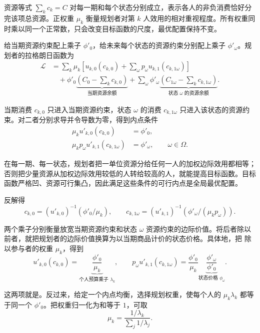 资源等式 $\sum_k c_k=C$ 对每一期和每个状态分别成立，表示各人的非负消费恰好分完该项总资源。正权重 $\mu_k$ 衡量规划者对第 $k$ 人效用的相对重视程度。所有权重同时乘以同一个正常数，只会改变目标函数的尺度，最优配置保持不变。

给当期资源约束配上乘子 $\phi'_0$，给未来每个状态的资源约束分别配上乘子 $\phi'_\omega$。规划者的拉格朗日函数为
\[
 \begin{aligned}
 \mathcal L
 &=\sum_k\mu_k\left[u_{k,0}(c_{k,0})+
                 \sum_\omega p_\omega u_{k,1}(c_{k,1\omega})\right]\\
 &\quad+\phi'_0\underbrace{\left(C_0-\sum_k c_{k,0}\right)}_{\text{当期资源余额}}
   +\sum_\omega\phi'_\omega
       \underbrace{\left(C_{1\omega}-\sum_k c_{k,1\omega}\right)}_{\text{状态 $\omega$ 的资源余额}}.
 \end{aligned}
\]

当期消费 $c_{k,0}$ 只进入当期资源约束，状态 $\omega$ 的消费 $c_{k,1\omega}$ 只进入该状态的资源约束。对二者分别求导并令导数为零，得到内点条件
\begin{subequations}\label{eq:wj-10-8}
\begin{align}
 \mu_k u'_{k,0}(c_{k,0})&=\phi'_0,\label{eq:wj-10-8a}\\
 \mu_k p_\omega u'_{k,1}(c_{k,1\omega})&=\phi'_\omega,
 \qquad \omega\in\Omega.\label{eq:wj-10-8b}
\end{align}
\end{subequations}

在每一期、每一状态，规划者把一单位资源分给任何一人的加权边际效用都相等；否则把少量资源从加权边际效用较低的人转给较高的人，就能提高目标函数。目标函数严格凹、资源可行集凸，因此满足这些条件的可行内点是全局最优配置。

反解得
\begin{equation}
 c_{k,0}=(u'_{k,0})^{-1}(\phi'_0/\mu_k),\qquad
 c_{k,1\omega}=(u'_{k,1})^{-1}(\phi'_\omega/(\mu_kp_\omega)).
 \label{eq:wj-10-9}
\end{equation}

两个乘子分别衡量放宽当期资源约束和状态 $\omega$ 资源约束的边际价值。将后者除以前者，就把规划者的边际价值换算为以当期商品计价的状态价格。具体地，把 除以参与者的权重 $\mu_k$，得到
\[
 u'_{k,0}(c_{k,0})=\underbrace{\frac{\phi'_0}{\mu_k}}_{\text{个人预算乘子 }\lambda_k},
 \qquad
 p_\omega u'_{k,1}(c_{k,1\omega})
 =\frac{\phi'_0}{\mu_k}\underbrace{\frac{\phi'_\omega}{\phi'_0}}_{\text{状态价格 }\phi_\omega}.
\]

这两项就是。反过来，给定一个内点均衡，选择规划权重，使每个人的 $\mu_k\lambda_k$ 都等于同一个 $\phi'_0$。把权重归一化为和等于 $1$，可取
\[
 \mu_k=\frac{1/\lambda_k}{\sum_j 1/\lambda_j}.
\]

